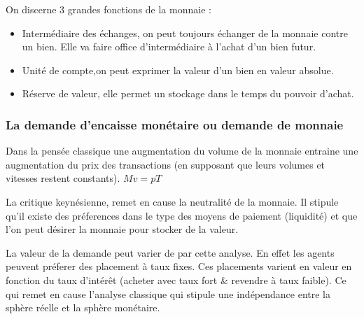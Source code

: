 On discerne 3 grandes fonctions de la monnaie : 

\begin{itemize}[label=]
	\item Intermédiaire des échanges, on peut toujours échanger de la monnaie contre un bien. Elle va faire office d'intermédiaire à l'achat d'un bien futur.
	\item Unité de compte,on peut exprimer la valeur d'un bien en valeur absolue.
	\item Réserve de valeur, elle permet un stockage dans le temps du pouvoir d'achat.
\end{itemize}


\subsubsection{La demande d'encaisse monétaire ou demande de monnaie} %
\label{sub:la_demande_d_encaisse_monetaire_ou_demande_de_monnaie}
Dans la pensée classique une augmentation du volume de la monnaie entraine une augmentation du prix des transactions (en supposant que leurs volumes et vitesses restent constants). $Mv=pT$

La critique keynésienne, remet en cause la neutralité de la monnaie. Il stipule qu'il existe des préferences dans le type des moyens de paiement (liquidité) et que l'on peut désirer la monnaie pour stocker de la valeur.

La valeur de la demande peut varier de par cette analyse. En effet les agents peuvent préferer des placement à taux fixes. Ces placements varient en valeur
en fonction du taux d'intérêt (acheter avec taux fort & revendre à taux faible). Ce qui remet en cause l'analyse classique qui stipule une indépendance entre 
la sphère réelle et la sphère monétaire.

